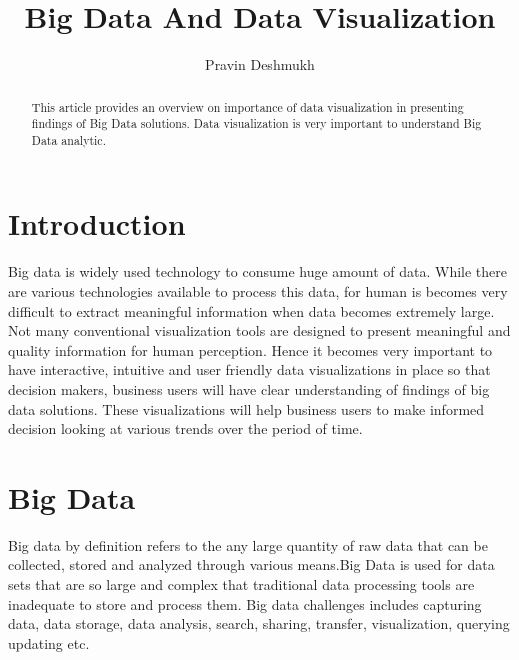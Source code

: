 \documentclass[sigconf]{acmart}
\begin{document}
\title{Big Data And Data Visualization}


\author{Pravin Deshmukh}


\begin{abstract}
This article provides an overview on importance of data visualization in presenting findings of Big Data solutions. Data visualization is very important to understand Big Data analytic.
\end{abstract}



\maketitle
\section{Introduction}

Big data is widely used technology to consume huge amount of data. While there are various technologies available to process this data, for human is becomes very difficult to extract meaningful information when data becomes extremely large. Not many conventional  visualization tools are designed to present meaningful and quality information for human perception. Hence it becomes very important to have interactive, intuitive and user friendly data visualizations in place so that decision makers, business users will have clear understanding of findings of big data solutions. These visualizations will help business users to make informed decision looking at various trends over the period of time.

\section{Big Data}
Big data by definition refers to the any large quantity of raw data that can be collected, stored and analyzed through various means.Big Data is used for data sets that are so large and complex that traditional data processing tools are inadequate to store and process them. Big data challenges includes capturing data, data storage, data analysis, search, sharing, transfer, visualization, querying updating etc. 
\end{document}

